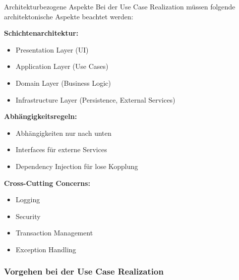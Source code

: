 \begin{concept}{Architekturbezogene Aspekte}
Bei der Use Case Realization müssen folgende architektonische Aspekte beachtet werden:

\textbf{Schichtenarchitektur:}
\begin{itemize}
    \item Presentation Layer (UI)
    \item Application Layer (Use Cases)
    \item Domain Layer (Business Logic)
    \item Infrastructure Layer (Persistence, External Services)
\end{itemize}

\textbf{Abhängigkeitsregeln:}
\begin{itemize}
    \item Abhängigkeiten nur nach unten
    \item Interfaces für externe Services
    \item Dependency Injection für lose Kopplung
\end{itemize}

\textbf{Cross-Cutting Concerns:}
\begin{itemize}
    \item Logging
    \item Security
    \item Transaction Management
    \item Exception Handling
\end{itemize}
\end{concept}





\subsubsection{Vorgehen bei der Use Case Realization}

